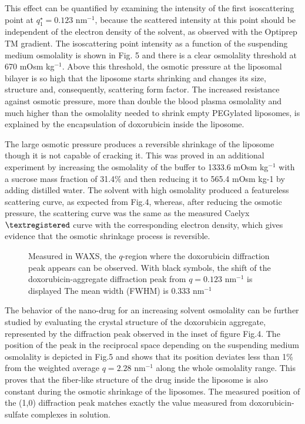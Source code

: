 This effect can be quantified by examining the intensity of the first isoscattering point at $q^{\star}_1 = 0.123$ nm$^{-1}$, because the scattered intensity at this point should be independent of the electron density of the solvent, as observed with the Optiprep TM gradient. The isoscattering point intensity as a function of the suspending medium osmolality is shown in Fig. 5 and there is a clear osmolality threshold at 670 mOsm kg$^{-1}$. Above this threshold, the osmotic pressure at the liposomal bilayer is so high that the liposome starts shrinking and changes its size, structure and, consequently, scattering form factor. The increased resistance against osmotic pressure, more than double the blood plasma osmolality and much higher than the osmolality needed to shrink empty PEGylated liposomes, is explained by the encapsulation of doxorubicin inside the liposome.

The large osmotic pressure produces a reversible shrinkage of the liposome though it is not capable of cracking it. This was proved in an additional experiment by increasing the osmolality of the buffer to 1333.6 mOsm kg$^{-1}$ with a sucrose mass fraction of 31.4$\%$ and then reducing it to 565.4 mOsm kg-1 by adding distilled water. The solvent with high osmolality produced a featureless scattering curve, as expected from Fig.4, whereas, after reducing the osmotic pressure, the scattering curve was the same as the measured Caelyx$\textregistered$ curve with the corresponding electron density, which gives evidence that the osmotic shrinkage process is reversible.

\begin{figure}
	\centering
		\caption{Measured in WAXS, the $q$-region where the doxorubicin diffraction peak appears can be observed. With black symbols, the shift of the doxorubicin-aggregate diffraction peak from $q=0.123$ nm$^{-1}$ is displayed The mean width (FWHM) is 0.333  nm$^{-1}$}
\end{figure}

The behavior of the nano-drug for an increasing solvent osmolality can be further studied by evaluating the crystal structure of the doxorubicin aggregate, represented by the diffraction peak observed in the inset of figure Fig.4. The position of the peak in the reciprocal space depending on the suspending medium osmolality is depicted in Fig.5 and shows that its position deviates less than 1$\%$ from the weighted average $q=2.28$ nm$^{-1}$ along the whole osmolality range. This proves that the fiber-like structure of the drug inside the liposome is also constant during the osmotic shrinkage of the liposomes. The measured position of the (1,0) diffraction peak matches exactly the value measured from doxorubicin-sulfate complexes in solution.

